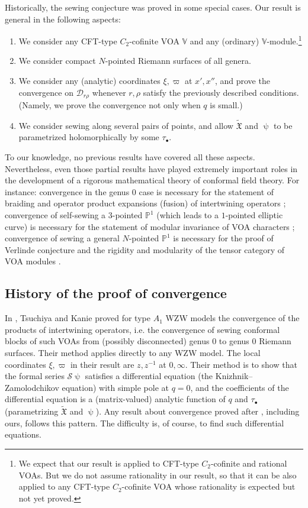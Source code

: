 \documentclass[12pt,a4paper,notitlepage]{article}
\theoremstyle{definition}
\theoremstyle{plain}
\newcommand{\fk}{\mathfrak}
\newcommand{\mc}{\mathcal}
\newcommand{\wtd}{\widetilde}
\newcommand{\blt}{\bullet}
\newcommand{\Vbb}{\mathbb V}
\newcommand{\Pbb}{\mathbb P}
\numberwithin{equation}{section}
\begin{document}
Historically, the sewing conjecture was proved in some special cases. Our result is general in the following aspects:
\begin{enumerate}[label=(\alph*)]
\item We consider any CFT-type $C_2$-cofinite VOA $\Vbb$ and any (ordinary) $\Vbb$-module.\footnote{We expect that our  result is  applied to CFT-type $C_2$-cofinite and  rational VOAs. But we do not assume rationality in our result, so that it can be also applied to any CFT-type $C_2$-cofinite VOA whose rationality is expected but not yet proved.}  
\item We consider  compact $N$-pointed Riemann surfaces of all genera.
\item We consider any (analytic) coordinates $\xi,\varpi$ at $x',x''$, and prove the convergence on $\mc D_{r\rho}$ whenever $r,\rho$ satisfy the previously described conditions. (Namely, we  prove the convergence not only when $q$ is small.)
\item We consider sewing along several pairs of points, and allow $\wtd{\fk X}$ and $\uppsi$ to be parametrized holomorphically by some $\tau_\blt$.
\end{enumerate}
To our knowledge, no previous results have covered all these aspects. Nevertheless, even those partial results have played extremely important roles in the development of a rigorous mathematical theory of conformal field theory. For instance: convergence in the genus $0$ case is necessary for the statement of braiding and operator product expansions (fusion) of intertwining operators \cite{TK88,Hua05a}; convergence of self-sewing a $3$-pointed $\Pbb^1$ (which leads to a $1$-pointed elliptic curve) is necessary for the statement of modular invariance of VOA characters \cite{Zhu96}; convergence of sewing a general $N$-pointed $\Pbb^1$ is necessary for the proof of Verlinde conjecture and the rigidity and modularity of the tensor category of VOA modules \cite{Hua05b,Hua08a,Hua08b}.




\subsection*{History of the proof of convergence}

In \cite{TK88}, Tsuchiya and Kanie proved for type $A_1$ WZW models the convergence of the  products of intertwining operators, i.e. the convergence of sewing conformal blocks of such VOAs from (possibly disconnected) genus $0$ to genus $0$ Riemann surfaces. Their method applies directly to any WZW model. The local coordinates $\xi,\varpi$ in their result are $z,z^{-1}$ at $0,\infty$.  Their method is to show that the formal series $\mc S\uppsi$ satisfies a differential equation (the Knizhnik–Zamolodchikov equation) with simple pole at $q=0$, and the coefficients of the differential equation is a (matrix-valued) analytic function of $q$ and $\tau_\blt$ (parametrizing $\wtd{\fk X}$ and $\uppsi$). Any result about convergence proved after \cite{TK88}, including ours, follows this pattern. The difficulty is, of course,  to find such differential equations. 
\end{document}
